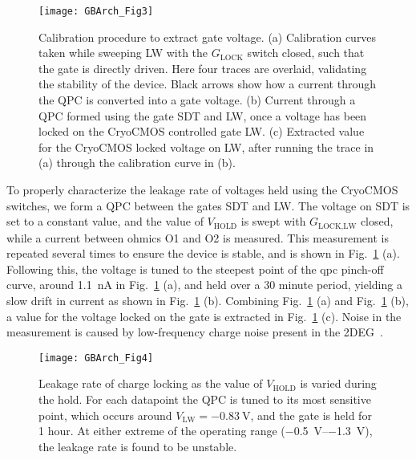 \begin{figure}
  \texttt{[image: GBArch\_Fig3]}
  \caption[Voltage Calibration Procedure and Hold Time]
  {\label{fig:gbvc}Calibration procedure to extract gate voltage. (a) Calibration curves taken while sweeping LW with the $G_\textrm{LOCK}$ switch closed, such that the gate is directly driven. Here four traces are overlaid, validating the stability of the device. Black arrows show how a current through the QPC is converted into a gate voltage. (b) Current through a QPC formed using the gate SDT and LW, once a voltage has been locked on the CryoCMOS controlled gate LW. (c) Extracted value for the CryoCMOS locked voltage on LW, after running the trace in (a) through the calibration curve in (b).}
\end{figure}

To properly characterize the leakage rate of voltages held using the CryoCMOS switches, we form a QPC between the gates SDT and LW. The voltage on SDT is set to
a constant value, and the value of $V_\textrm{HOLD}$ is swept with $G_\textrm{LOCK,LW}$ closed, while a current between ohmics O1 and O2 is measured. This measurement is
repeated several times to ensure the device is stable, and is shown in Fig.~\ref{fig:gbvc} (a). Following this, the voltage is tuned to the steepest point of the qpc pinch-off
curve, around \SI{1.1}{\nano\ampere} in Fig.~\ref{fig:gbvc} (a), and held over a 30 minute period, yielding a slow drift in current as shown in Fig.~\ref{fig:gbvc} (b).
Combining Fig.~\ref{fig:gbvc} (a) and Fig.~\ref{fig:gbvc} (b), a value for the voltage locked on the gate is extracted in Fig.~\ref{fig:gbvc} (c). Noise in the measurement
is caused by low-frequency charge noise present in the 2DEG~\cite{PhysRevApplied.9.034008}.

\begin{figure}
  \texttt{[image: GBArch\_Fig4]}
  \caption[Leakage Rate of Charge Locking]
  {\label{fig:gblr}Leakage rate of charge locking as the value of $V_\textrm{HOLD}$ is varied during the hold. For each datapoint the QPC is tuned to its most sensitive point,
  which occurs around $V_\textrm{LW} = \SI{-0.83}{\volt}$, and the gate is held for 1 hour. At either extreme of the operating range (\SIrange{-0.5}{-1.3}{\volt}), the leakage
  rate is found to be unstable.}
\end{figure}


